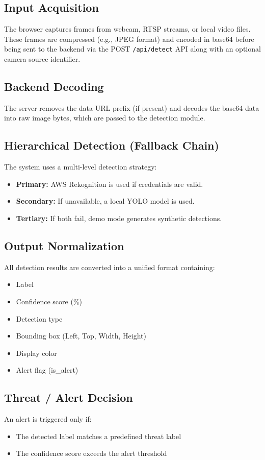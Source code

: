 \documentclass[10pt,openany]{report}
\begin{document}
\begin{sloppypar}
{{{\begin{sloppypar}
\subsection{Input Acquisition}
The browser captures frames from webcam, RTSP streams, or local video files. These frames are compressed (e.g., JPEG format) and encoded in base64 before being sent to the backend via the POST \texttt{/api/detect} API along with an optional camera source identifier.

\subsection{Backend Decoding}
The server removes the data-URL prefix (if present) and decodes the base64 data into raw image bytes, which are passed to the detection module.

\subsection{Hierarchical Detection (Fallback Chain)}
The system uses a multi-level detection strategy:
\begin{itemize}
    \item \textbf{Primary:} AWS Rekognition is used if credentials are valid.
    \item \textbf{Secondary:} If unavailable, a local YOLO model is used.
    \item \textbf{Tertiary:} If both fail, demo mode generates synthetic detections.
\end{itemize}

\subsection{Output Normalization}
All detection results are converted into a unified format containing:
\begin{itemize}
    \item Label
    \item Confidence score (\%)
    \item Detection type
    \item Bounding box (Left, Top, Width, Height)
    \item Display color
    \item Alert flag (is\_alert)
\end{itemize}

\subsection{Threat / Alert Decision}
An alert is triggered only if:
\begin{itemize}
    \item The detected label matches a predefined threat label
    \item The confidence score exceeds the alert threshold
\end{itemize}


\end{sloppypar}}}}
\end{sloppypar}
\end{document}
